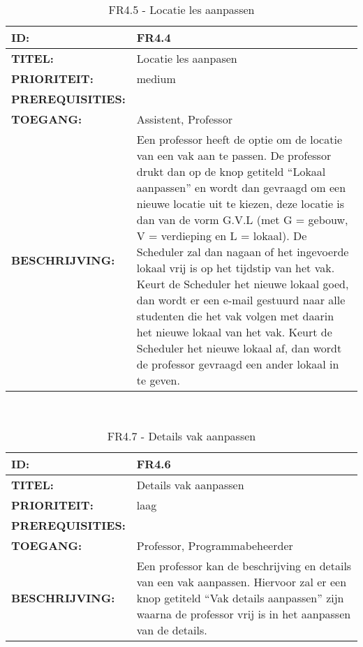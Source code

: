 \noindent\begin{table}[H]
            \begin{tabular}{l | p{10cm}}
                \textbf{ID:} & FR4.4 \\ \hline
                \textbf{TITEL:} & Locatie les aanpasen\\ \hline
                \textbf{PRIORITEIT:} &  medium \\ \hline
                \textbf{PREREQUISITIES:} & \\ \hline
                \textbf{TOEGANG:} & Assistent, Professor \\ \hline
                \textbf{BESCHRIJVING:} & Een professor heeft de optie om de locatie van een vak aan te passen. 
                                        De professor drukt dan op de knop getiteld “Lokaal aanpassen” en wordt dan gevraagd om een nieuwe locatie uit te kiezen, deze locatie is dan van de vorm G.V.L (met G = gebouw, V = verdieping en L = lokaal). De Scheduler zal dan nagaan of het ingevoerde lokaal vrij is op het tijdstip van het vak. Keurt de Scheduler het nieuwe lokaal goed, dan wordt er een e-mail gestuurd naar alle studenten die het vak volgen met daarin het nieuwe lokaal van het vak. Keurt de Scheduler het nieuwe lokaal af, dan wordt de professor gevraagd een ander lokaal in te geven.\\ 
            \end{tabular}\\
            \caption{FR4.5 - Locatie les aanpassen}
            \label{tab:FR4.5 - Locatie les aanpassen}
        \end{table}
        
        
\noindent\begin{table}[H]
            \begin{tabular}{l | p{10cm}}
                \textbf{ID:} & FR4.6 \\ \hline
                \textbf{TITEL:} & Details vak aanpassen\\ \hline
                \textbf{PRIORITEIT:} &  laag \\ \hline
                \textbf{PREREQUISITIES:} & \\ \hline
                \textbf{TOEGANG:} & Professor, Programmabeheerder \\ \hline
                \textbf{BESCHRIJVING:} & Een professor kan de beschrijving en details van een vak aanpassen. Hiervoor zal er een knop getiteld “Vak details aanpassen” zijn waarna de professor vrij is in het aanpassen van de details. \\ 
            \end{tabular}\\
            \caption{FR4.7 - Details vak aanpassen}
            \label{tab:FR4.7 - Details vak aanpassen}
        \end{table}	
        
